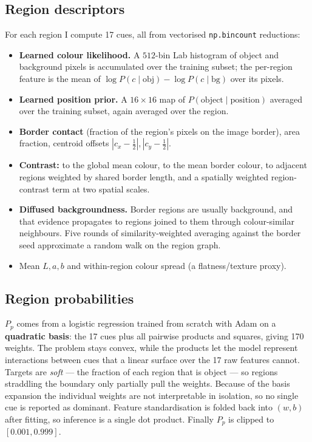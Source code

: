 \documentclass[11pt,a4paper]{article}
\begin{document}
\subsection{Region descriptors}
For each region I compute 17 cues, all from vectorised \texttt{np.bincount} reductions:
\begin{itemize}
\item \textbf{Learned colour likelihood.} A $512$-bin Lab histogram of object and
background pixels is accumulated over the training subset; the per-region feature is the
mean of $\log P(c\mid\text{obj}) - \log P(c\mid\text{bg})$ over its pixels.
\item \textbf{Learned position prior.} A $16\times16$ map of $P(\text{object}\mid
\text{position})$ averaged over the training subset, again averaged over the region.
\item \textbf{Border contact} (fraction of the region's pixels on the image border),
area fraction, centroid offsets $|c_x-\tfrac12|,|c_y-\tfrac12|$.
\item \textbf{Contrast:} to the global mean colour, to the mean border colour, to
adjacent regions weighted by shared border length, and a spatially weighted
region-contrast term at two spatial scales.
\item \textbf{Diffused backgroundness.} Border regions are usually background, and that
evidence propagates to regions joined to them through colour-similar neighbours. Five
rounds of similarity-weighted averaging against the border seed approximate a random
walk on the region graph.
\item Mean $L,a,b$ and within-region colour spread (a flatness/texture proxy).
\end{itemize}

\subsection{Region probabilities}
$P_p$ comes from a logistic regression trained from scratch with Adam on a
\textbf{quadratic basis}: the 17 cues plus all pairwise products and squares, giving
170 weights. The problem stays convex, while the products let the model represent
interactions between cues that a linear surface over the 17 raw features cannot. Targets
are \emph{soft} --- the fraction of each region that is object --- so regions straddling
the boundary only partially pull the weights. Because of the basis expansion the
individual weights are not interpretable in isolation, so no single cue is reported as
dominant. Feature standardisation is folded back into $(w,b)$ after fitting, so
inference is a single dot product. Finally $P_p$ is clipped to $[0.001,0.999]$.
\end{document}
